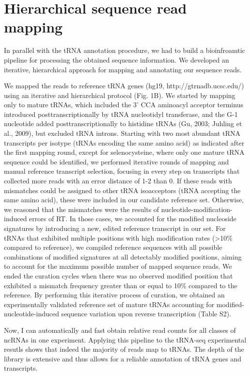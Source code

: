 \documentclass[12pt]{rockefeller}
\begin{document}
\section{Hierarchical sequence read mapping}
In parallel with the tRNA annotation procedure, we had to build a bioinfroamtic pipeline for processing the obtained sequence information.
We developed an iterative, hierarchical approach for mapping and annotating our sequence reads. 

We mapped the reads to reference tRNA genes (hg19, http://gtrnadb.ucsc.edu/) using an iterative and hierarchical protocol (Fig. 1B). We started by mapping only to mature tRNAs, which included the 3’ CCA aminoacyl acceptor terminus introduced posttranscriptionally by tRNA nucleotidyl transferase, and the G-1 nucleotide added posttranscriptionally to histidine tRNAs (Gu, 2003; Juhling et al., 2009), but excluded tRNA introns. Starting with two most abundant tRNA transcripts per isotype (tRNAs encoding the same amino acid) as indicated after the first mapping round, except for selenocysteine, where only one mature tRNA sequence could be identified, we performed iterative rounds of mapping and manual reference transcript selection, focusing in every step on transcripts that collected more reads with an error distance of 1-2 than 0. If these reads with mismatches could be assigned to other tRNA isoacceptors (tRNA accepting the same amino acid), these were included in our candidate reference set. Otherwise, we reasoned that the mismatches were the results of nucleotide-modification-induced errors of RT. In those cases, we accounted for the modified nucleoside signatures by introducing a new, edited reference transcript in our set. For tRNAs that exhibited multiple positions with high modification rates (>10\% compared to reference), we compiled reference sequences with all possible combinations of modified signatures at all detectably modified positions, aiming to account for the maximum possible number of mapped sequence reads. We ended the curation cycles when there was no observed modified position that exhibited a mismatch frequency greater than or equal to 10\% compared to the reference. By performing this iterative process of curation, we obtained an experimentally validated reference set of mature tRNAs accounting for modified-nucleotide-induced sequence variation upon reverse transcription (Table S2).


Now, I can automatically and fast obtain relative read counts for all classes of ncRNAs in one experiment. 
Applying this pipeline to the tRNA-seq experimental resutls shows that indeed the majority of reads map to tRNAs. The depth of the library is extensive and thus allows for a reliable annotation of tRNA genes and transcripts. 
\end{document}
